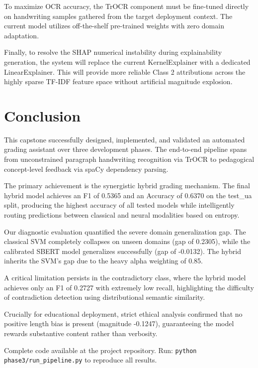 \documentclass[conference]{IEEEtran}
\begin{document}
To maximize OCR accuracy, the TrOCR component must be fine-tuned directly on handwriting samples gathered from the target deployment context. The current model utilizes off-the-shelf pre-trained weights with zero domain adaptation.

Finally, to resolve the SHAP numerical instability during explainability generation, the system will replace the current KernelExplainer with a dedicated LinearExplainer. This will provide more reliable Class 2 attributions across the highly sparse TF-IDF feature space without artificial magnitude explosion.

\section{Conclusion}
This capstone successfully designed, implemented, and validated an automated grading assistant over three development phases. The end-to-end pipeline spans from unconstrained paragraph handwriting recognition via TrOCR to pedagogical concept-level feedback via spaCy dependency parsing.

The primary achievement is the synergistic hybrid grading mechanism. The final hybrid model achieves an F1 of 0.5365 and an Accuracy of 0.6370 on the test\_ua split, producing the highest accuracy of all tested models while intelligently routing predictions between classical and neural modalities based on entropy.

Our diagnostic evaluation quantified the severe domain generalization gap. The classical SVM completely collapses on unseen domains (gap of 0.2305), while the calibrated SBERT model generalizes successfully (gap of -0.0132). The hybrid inherits the SVM's gap due to the heavy alpha weighting of 0.85. 

A critical limitation persists in the contradictory class, where the hybrid model achieves only an F1 of 0.2727 with extremely low recall, highlighting the difficulty of contradiction detection using distributional semantic similarity.

Crucially for educational deployment, strict ethical analysis confirmed that no positive length bias is present (magnitude -0.1247), guaranteeing the model rewards substantive content rather than verbosity. 

Complete code available at the project repository. Run: \texttt{python phase3/run\_pipeline.py} to reproduce all results.
\end{document}
